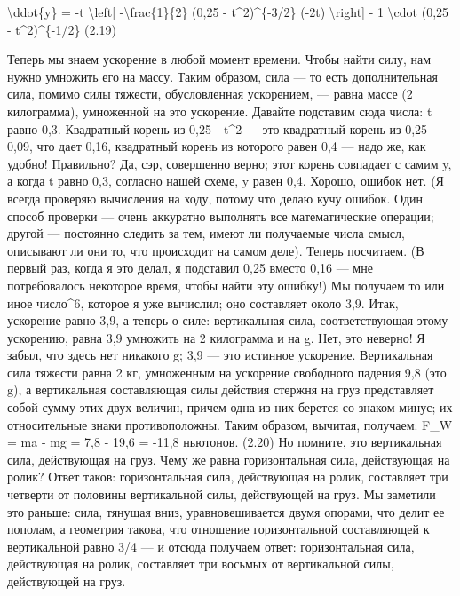\documentclass[10pt,oneside]{article}
\begin{document}
\textbackslash{}ddot\{y\} = -t \textbackslash{}left[ -\textbackslash{}frac\{1\}\{2\} (0,25 - t\textasciicircum{}2)\textasciicircum{}\{-3/2\} (-2t) \textbackslash{}right] - 1 \textbackslash{}cdot (0,25 - t\textasciicircum{}2)\textasciicircum{}\{-1/2\} (2.19)\par

Теперь мы знаем ускорение в любой момент времени. Чтобы найти силу, нам нужно умножить его на массу. Таким образом, сила --- то есть дополнительная сила, помимо силы тяжести, обусловленная ускорением, --- равна массе (2 килограмма), умноженной на это ускорение. Давайте подставим сюда числа: t равно 0,3. Квадратный корень из 0,25 - t\textasciicircum{}2 --- это квадратный корень из 0,25 - 0,09, что дает 0,16, квадратный корень из которого равен 0,4 --- надо же, как удобно! Правильно? Да, сэр, совершенно верно; этот корень совпадает с самим y, а когда t равно 0,3, согласно нашей схеме, y равен 0,4. Хорошо, ошибок нет. (Я всегда проверяю вычисления на ходу, потому что делаю кучу ошибок. Один способ проверки --- очень аккуратно выполнять все математические операции; другой --- постоянно следить за тем, имеют ли получаемые числа смысл, описывают ли они то, что происходит на самом деле). Теперь посчитаем. (В первый раз, когда я это делал, я подставил 0,25 вместо 0,16 --- мне потребовалось некоторое время, чтобы найти эту ошибку!) Мы получаем то или иное число\textasciicircum{}6, которое я уже вычислил; оно составляет около 3,9. Итак, ускорение равно 3,9, а теперь о силе: вертикальная сила, соответствующая этому ускорению, равна 3,9 умножить на 2 килограмма и на g. Нет, это неверно! Я забыл, что здесь нет никакого g; 3,9 --- это истинное ускорение. Вертикальная сила тяжести равна 2 кг, умноженным на ускорение свободного падения 9,8 (это g), а вертикальная составляющая силы действия стержня на груз представляет собой сумму этих двух величин, причем одна из них берется со знаком минус; их относительные знаки противоположны. Таким образом, вычитая, получаем: F\_W = ma - mg = 7,8 - 19,6 = -11,8 ньютонов. (2.20) Но помните, это вертикальная сила, действующая на груз. Чему же равна горизонтальная сила, действующая на ролик? Ответ таков: горизонтальная сила, действующая на ролик, составляет три четверти от половины вертикальной силы, действующей на груз. Мы заметили это раньше: сила, тянущая вниз, уравновешивается двумя опорами, что делит ее пополам, а геометрия такова, что отношение горизонтальной составляющей к вертикальной равно 3/4 --- и отсюда получаем ответ: горизонтальная сила, действующая на ролик, составляет три восьмых от вертикальной силы, действующей на груз.\par
\end{document}

